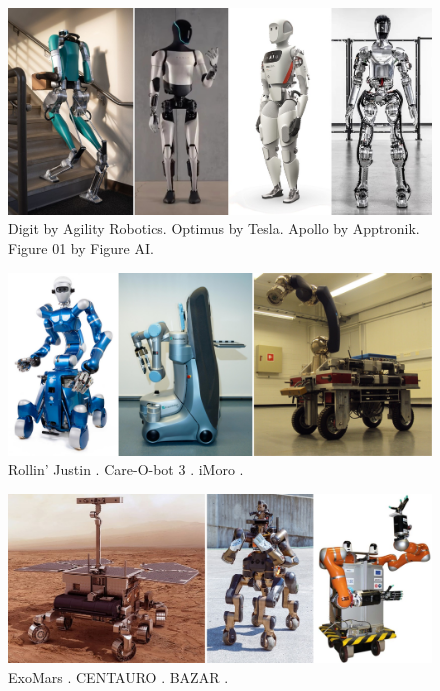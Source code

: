 \begin{figure}
    \centering
    \includegraphics[width=\textwidth]{figures/01-introduction/robots-in-2020.jpg}
    \caption{Digit by Agility Robotics. Optimus by Tesla. Apollo by Apptronik.
        Figure 01 by Figure AI.
    }
    \label{fig:introduction:robots-in-2020}
\end{figure}

\begin{figure}
    \centering
    \includegraphics[width=\textwidth]{figures/01-introduction/SWMRs-1.jpg}
    \caption{Rollin' Justin \cite{Fuchs2009RollinJustin}.
        Care-O-bot 3 \cite{Graf2009Care-O-bot3}.
        iMoro \cite{Oftadeh2013iMoro}.}
    \label{fig:introduction:SWMRs-1}
\end{figure}

\begin{figure}
    \centering
    \includegraphics[width=\textwidth]{figures/01-introduction/SWMRs-2.jpg}
    \caption{ExoMars \cite{Poulakis2015ExoMarsMobilitySubsystem}.
        CENTAURO \cite{Kashiri2019Centauro}.
        BAZAR \cite{Cherubini2019ACR}.
    }
    \label{fig:introduction:SWMRs-2}
\end{figure}
